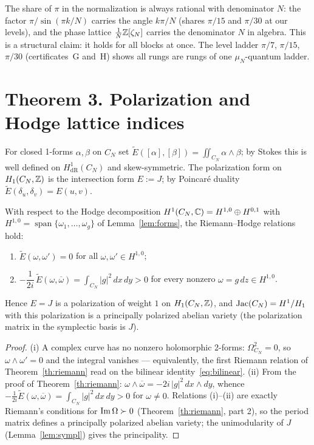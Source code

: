 \begin{remark}
The share of $\pi$ in the normalization is always rational with
denominator $N$: the factor $\pi/\sin(\pi k/N)$ carries the angle
$k\pi/N$ (shares $\pi/15$ and $\pi/30$ at our levels), and the phase
lattice $\frac1N\mathbb{Z}[\zeta_N]$ carries the denominator $N$ in
algebra. This is a structural claim: it holds for all blocks at
once. The level ladder $\pi/7$, $\pi/15$, $\pi/30$ (certificates~G
and~H) shows all rungs are rungs of one $\mu_N$-quantum ladder.
\end{remark}

\section{Theorem 3. Polarization and Hodge lattice indices}
\label{sec:indices}

\begin{definition}[polarization]\label{def:polarization}
For closed 1-forms $\alpha,\beta$ on $C_N$ set
$\widetilde E([\alpha],[\beta])=\iint_{C_N}\alpha\wedge\beta$; by
Stokes this is well defined on $H^1_{\mathrm{dR}}(C_N)$ and
skew-symmetric. The polarization form on $H_1(C_N,\mathbb{Z})$ is the
intersection form $E:=J$; by Poincar\'e duality
$\widetilde E(\delta_u,\delta_v)=E(u,v)$.
\end{definition}

\begin{theorem}\label{th:polarization}
With respect to the Hodge decomposition
$H^1(C_N,\mathbb{C})=H^{1,0}\oplus H^{0,1}$ with
$H^{1,0}=\operatorname{span}\{\omega_1,\dots,\omega_g\}$ of
Lemma~\ref{lem:forms}, the Riemann--Hodge relations hold:
\begin{enumerate}[leftmargin=2em, itemsep=0.15em]
\item $\widetilde E(\omega,\omega')=0$ for all
  $\omega,\omega'\in H^{1,0}$;
\item $-\dfrac{1}{2i}\,\widetilde E(\omega,\overline{\omega})
  =\displaystyle\int_{C_N}|g|^2\,dx\,dy>0$ for every nonzero
  $\omega=g\,dz\in H^{1,0}$.
\end{enumerate}
Hence $E=J$ is a polarization of weight $1$ on $H_1(C_N,\mathbb{Z})$, and
$\operatorname{Jac}(C_N)=H^1/H_1$ with this polarization is a principally
polarized abelian variety (the polarization matrix in the symplectic
basis is $J$).
\end{theorem}

\begin{proof}
(i) A complex curve has no nonzero holomorphic 2-forms:
$\Omega^2_{C_N}=0$, so $\omega\wedge\omega'=0$ and the integral
vanishes --- equivalently, the first Riemann relation of
Theorem~\ref{th:riemann} read on the bilinear
identity~\eqref{eq:bilinear}. (ii) From the proof of
Theorem~\ref{th:riemann}:
$\omega\wedge\overline{\omega}=-2i\,|g|^2\,dx\wedge dy$, whence
$-\frac{1}{2i}\widetilde E(\omega,\overline{\omega})
=\int_{C_N}|g|^2\,dx\,dy>0$ for $\omega\ne0$. Relations (i)--(ii)
are exactly Riemann's conditions for $\operatorname{Im}\Omega\succ0$
(Theorem~\ref{th:riemann}, part 2), so the period matrix defines a
principally polarized abelian variety; the unimodularity of $J$
(Lemma~\ref{lem:sympl}) gives the principality.
\end{proof}

